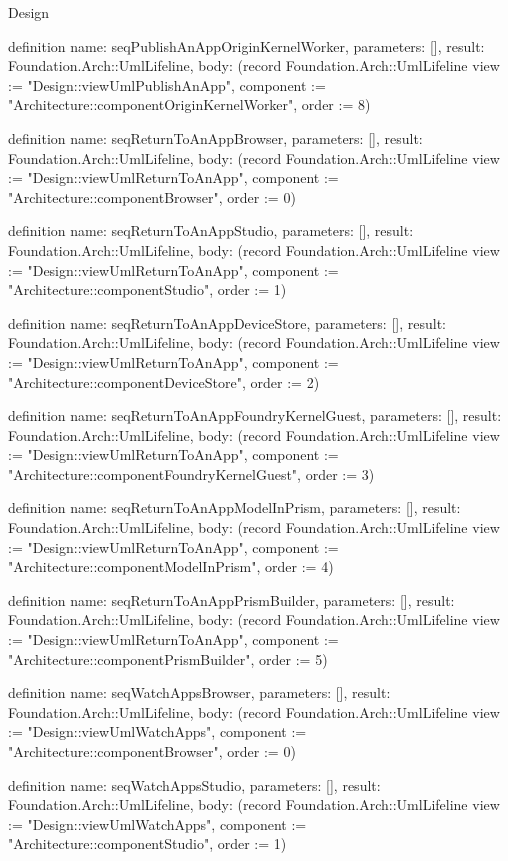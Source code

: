 \begin{lexlean}{Design}
\begin{semanticmodule}
definition{
  name: seqPublishAnAppOriginKernelWorker,
  parameters: [],
  result: Foundation.Arch::UmlLifeline,
  body: (record Foundation.Arch::UmlLifeline {view := "Design::viewUmlPublishAnApp", component := "Architecture::componentOriginKernelWorker", order := 8})
}

definition{
  name: seqReturnToAnAppBrowser,
  parameters: [],
  result: Foundation.Arch::UmlLifeline,
  body: (record Foundation.Arch::UmlLifeline {view := "Design::viewUmlReturnToAnApp", component := "Architecture::componentBrowser", order := 0})
}

definition{
  name: seqReturnToAnAppStudio,
  parameters: [],
  result: Foundation.Arch::UmlLifeline,
  body: (record Foundation.Arch::UmlLifeline {view := "Design::viewUmlReturnToAnApp", component := "Architecture::componentStudio", order := 1})
}

definition{
  name: seqReturnToAnAppDeviceStore,
  parameters: [],
  result: Foundation.Arch::UmlLifeline,
  body: (record Foundation.Arch::UmlLifeline {view := "Design::viewUmlReturnToAnApp", component := "Architecture::componentDeviceStore", order := 2})
}

definition{
  name: seqReturnToAnAppFoundryKernelGuest,
  parameters: [],
  result: Foundation.Arch::UmlLifeline,
  body: (record Foundation.Arch::UmlLifeline {view := "Design::viewUmlReturnToAnApp", component := "Architecture::componentFoundryKernelGuest", order := 3})
}

definition{
  name: seqReturnToAnAppModelInPrism,
  parameters: [],
  result: Foundation.Arch::UmlLifeline,
  body: (record Foundation.Arch::UmlLifeline {view := "Design::viewUmlReturnToAnApp", component := "Architecture::componentModelInPrism", order := 4})
}

definition{
  name: seqReturnToAnAppPrismBuilder,
  parameters: [],
  result: Foundation.Arch::UmlLifeline,
  body: (record Foundation.Arch::UmlLifeline {view := "Design::viewUmlReturnToAnApp", component := "Architecture::componentPrismBuilder", order := 5})
}

definition{
  name: seqWatchAppsBrowser,
  parameters: [],
  result: Foundation.Arch::UmlLifeline,
  body: (record Foundation.Arch::UmlLifeline {view := "Design::viewUmlWatchApps", component := "Architecture::componentBrowser", order := 0})
}

definition{
  name: seqWatchAppsStudio,
  parameters: [],
  result: Foundation.Arch::UmlLifeline,
  body: (record Foundation.Arch::UmlLifeline {view := "Design::viewUmlWatchApps", component := "Architecture::componentStudio", order := 1})
}


\end{semanticmodule}
\end{lexlean}
